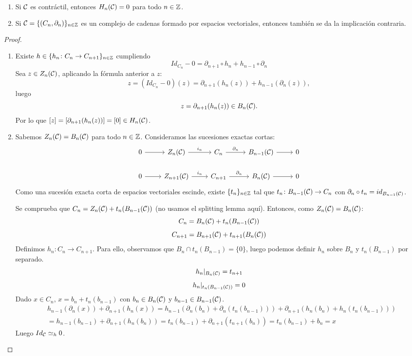 \documentclass[HS.tex]{subfiles}
\begin{document}
\begin{prop}\mbox{}
\begin{enumerate}
\item Si $\mathcal{C}$ es contráctil, entonces $H_n(\mathcal{C}) = 0$ para todo $n \in \mathbb{Z}$.
\item Si $\mathcal{C} = \{(C_n,\partial_n)\}_{n \in \mathbb{Z}}$ es un complejo de cadenas formado por espacios vectoriales, entonces también se da la implicación contraria.
\end{enumerate}
\end{prop}
\begin{proof}\
\begin{enumerate}
\item Existe $h \in \{h_n \colon C_n \to C_{n+1}\}_{n \in \mathbb{Z}}$ cumpliendo 
\[ Id_{C_n}-0 = \partial_{n+1} \circ h_n + h_{n-1} \circ \partial_n \]
Sea $z \in Z_n(\mathcal{C})$, aplicando la fórmula anterior a $z$:
\[ z=(Id_{C_n}-0)(z) = \partial_{n+1}(h_n(z)) + h_{n-1}(\partial_n(z)), \]
luego
\[ z = \partial_{n+1}(h_n(z)) \in B_n(\mathcal{C}). \]
Por lo que $[z] = [\partial_{n+1}(h_n(z))] = [0] \in H_n(\mathcal{C})$.

\item Sabemos $Z_n(\mathcal{C}) = B_n(\mathcal{C})$ para todo $n \in \mathbb{Z}$.
Consideramos las sucesiones exactas cortas:
\[
\begin{tikzcd}
0 \arrow[r] & Z_n(\CC) \arrow[r,"i_n"] & C_n \arrow[r,"\partial_n"] & B_{n-1}(\CC)\arrow[r] &  0\\
0 \arrow[r] & Z_{n+1}(\CC) \arrow[r,"i_n"] & C_{n+1} \arrow[r,"\partial_n"] & B_n(\CC) \arrow[r]&  0
\end{tikzcd}
\]
Como una sucesión exacta corta de espacios vectoriales escinde, existe $\{t_n\}_{n \in \mathbb{Z}}$ tal que $t_n \colon B_{n-1}(\mathcal{C}) \to C_n$ con $\partial_n \circ t_n = id_{B_{n-1}(\mathcal{C})}$.

Se comprueba que $C_n = Z_n(\mathcal{C}) + t_n(B_{n-1}(\mathcal{C}))$ (no usamos el splitting lemma aquí).
Entonces, como $Z_n(\mathcal{C}) = B_n(\mathcal{C})$:
\[ C_n = B_n(\mathcal{C}) + t_n(B_{n-1}(\mathcal{C})) \]
\[ C_{n+1}= B_{n+1}(\mathcal{C}) + t_{n+1}(B_n(\mathcal{C})) \]
Definimos $h_n \colon C_n \to C_{n+1}$. Para ello, observamos que $B_n \cap t_n(B_{n-1}) = \{0\}$, luego podemos definir $h_n$ sobre $B_n$ y $t_n(B_{n-1})$ por separado.
\[ h_n|_{B_n(\mathcal{C})} = t_{n+1} \]
\[ h_n|_{t_n(B_{n-1}(\mathcal{C}))} = 0 \]
Dado $x \in C_n$, $x = b_n + t_n(b_{n-1})$ con $b_n \in B_n(\mathcal{C})$ y $b_{n-1} \in B_{n-1}(\mathcal{C})$.
\begin{align*}
& h_{n-1}(\partial_n(x)) + \partial_{n+1}(h_n(x)) = h_{n-1}(\partial_n(b_n)+\partial_n(t_n(b_{n-1}))) + \partial_{n+1}(h_n(b_n)+h_n(t_n(b_{n-1}))) \\
& = h_{n-1}(b_{n-1}) + \partial_{n+1}(h_n(b_n)) = t_n(b_{n-1}) + \partial_{n+1}(t_{n+1}(b_n)) = t_n(b_{n-1})+b_n = x
\end{align*}
Luego $Id_{\mathcal{C}} \simeq_h 0$.
\end{enumerate}
\end{proof}
\end{document}
